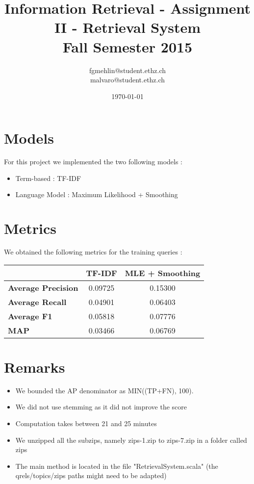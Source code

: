 \documentclass[a4paper, 11pt]{article}
\title{Information Retrieval - Assignment II - Retrieval System \\ Fall Semester 2015}
\author{fgmehlin@student.ethz.ch\\ malvaro@student.ethz.ch\\}
\date{\today}
\begin{document}
\maketitle

\section{Models} 
For this project we implemented the two following models :
\begin{itemize}
\item Term-based : TF-IDF
\item Language Model : Maximum Likelihood + Smoothing
\end{itemize}

\section{Metrics}
We obtained the following metrics for the training queries : 

\begin{table}[!ht]
\centering
\label{my-label}
\begin{tabular}{l|c|c|}
\cline{2-3}
\textbf{}                                          & \textbf{TF-IDF} & \textbf{MLE + Smoothing} \\ \hline
\multicolumn{1}{|l|}{\textbf{Average Precision }} & 0.09725         & 0.15300                  \\ \hline
\multicolumn{1}{|l|}{\textbf{Average Recall }}    & 0.04901         & 0.06403                  \\ \hline
\multicolumn{1}{|l|}{\textbf{Average F1 }}        & 0.05818         & 0.07776                  \\ \hline
\multicolumn{1}{|l|}{\textbf{MAP }}               & 0.03466         & 0.06769                  \\ \hline
\end{tabular}
\end{table}

\section{Remarks} 

\begin{itemize}
\item We bounded the AP denominator as MIN((TP+FN), 100).
\item We did not use stemming as it did not improve the score
\item Computation takes between 21 and 25 minutes
\item We unzipped all the subzips, namely  zips-1.zip to zips-7.zip in a folder called zips
\item The main method is located in the file "RetrievalSystem.scala" (the qrels/topics/zips paths might need to be adapted)
\end{itemize}
\end{document}
